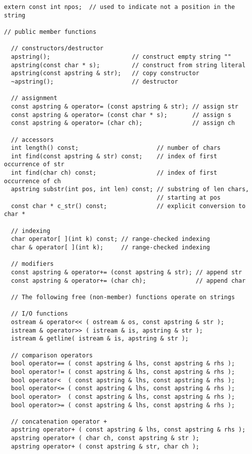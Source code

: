\begin{verbatim}
extern const int npos;  // used to indicate not a position in the string

// public member functions

  // constructors/destructor
  apstring();                       // construct empty string ""
  apstring(const char * s);         // construct from string literal
  apstring(const apstring & str);   // copy constructor
  ~apstring();                      // destructor

  // assignment
  const apstring & operator= (const apstring & str); // assign str
  const apstring & operator= (const char * s);       // assign s
  const apstring & operator= (char ch);              // assign ch

  // accessors
  int length() const;                      // number of chars
  int find(const apstring & str) const;    // index of first occurrence of str
  int find(char ch) const;                 // index of first occurrence of ch
  apstring substr(int pos, int len) const; // substring of len chars, 
                                           // starting at pos
  const char * c_str() const;              // explicit conversion to char *

  // indexing
  char operator[ ](int k) const; // range-checked indexing
  char & operator[ ](int k);     // range-checked indexing

  // modifiers
  const apstring & operator+= (const apstring & str); // append str
  const apstring & operator+= (char ch);              // append char

  // The following free (non-member) functions operate on strings

  // I/O functions
  ostream & operator<< ( ostream & os, const apstring & str );
  istream & operator>> ( istream & is, apstring & str );
  istream & getline( istream & is, apstring & str );

  // comparison operators
  bool operator== ( const apstring & lhs, const apstring & rhs );
  bool operator!= ( const apstring & lhs, const apstring & rhs );
  bool operator<  ( const apstring & lhs, const apstring & rhs );
  bool operator<= ( const apstring & lhs, const apstring & rhs );
  bool operator>  ( const apstring & lhs, const apstring & rhs );
  bool operator>= ( const apstring & lhs, const apstring & rhs );

  // concatenation operator +
  apstring operator+ ( const apstring & lhs, const apstring & rhs );
  apstring operator+ ( char ch, const apstring & str );
  apstring operator+ ( const apstring & str, char ch );
\end{verbatim}

